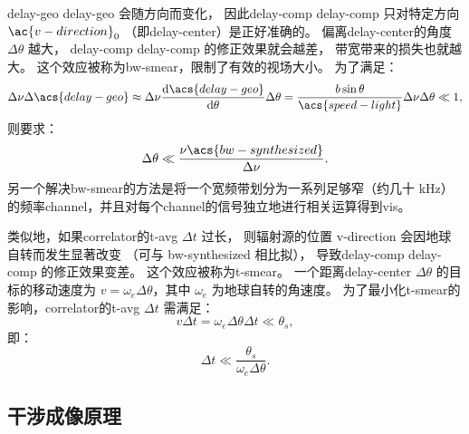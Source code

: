 \acl{delay-geo} \acs{delay-geo} 会随方向而变化，
因此\acl{delay-comp} \acs{delay-comp} 只对特定方向 $\ac{v-direction}_0$
（即\ac{delay-center}）是正好准确的。
偏离\ac{delay-center}的角度 $\Delta\theta$ 越大，
\acl{delay-comp} \acs{delay-comp} 的修正效果就会越差，
带宽带来的损失也就越大。
这个效应被称为\acf{bw-smear}，限制了有效的视场大小。
为了满足：
\begin{equation}
  \Delta\nu \Delta\acs{delay-geo}
    \approx \Delta\nu \diff{\acs{delay-geo}}{\theta} \Delta\theta
    = \frac{b \sin\theta}{\acs{speed-light}} \Delta\nu \Delta\theta
    \ll 1 ,
\end{equation}
则要求：
\begin{equation}
  \Delta\theta \ll \frac{\nu \acs{bw-synthesized}}{\Delta\nu} .
\end{equation}
另一个解决\ac{bw-smear}的方法是将一个宽频带划分为一系列足够窄（约几十 \si{\kHz}）
的频率\ac{channel}，并且对每个\ac{channel}的信号独立地进行相关运算得到\ac{vis}。

类似地，如果\ac{correlator}的\ac{t-avg} $\Delta t$ 过长，
则辐射源的位置 \ac{v-direction} 会因地球自转而发生显著改变
（可与 \acs{bw-synthesized} 相比拟），
导致\acl{delay-comp} \acs{delay-comp} 的修正效果变差。
这个效应被称为\acf{t-smear}。
一个距离\ac{delay-center} $\Delta\theta$ 的目标的移动速度为
$v = \omega_e \Delta\theta$，其中 $\omega_e$ 为地球自转的角速度。
为了最小化\ac{t-smear}的影响，\ac{correlator}的\ac{t-avg} $\Delta t$ 需满足：
\begin{equation}
  v \Delta t = \omega_e \Delta\theta \Delta t \ll \theta_s ,
\end{equation}
即：
\begin{equation}
  \label{eq:correlator-avgtime}
  \Delta t \ll \frac{\theta_s}{\omega_e \Delta\theta} .
\end{equation}

\subsection{干涉成像原理}


